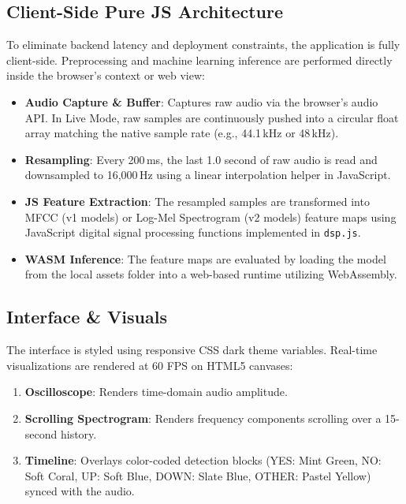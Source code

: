 \documentclass[11pt,a4paper]{article}
\begin{document}
\subsection{Client-Side Pure JS Architecture}
To eliminate backend latency and deployment constraints, the application is fully client-side. Preprocessing and machine learning inference are performed directly inside the browser's context or web view:
\begin{itemize}
    \item \textbf{Audio Capture \& Buffer}: Captures raw audio via the browser's audio API. In Live Mode, raw samples are continuously pushed into a circular float array matching the native sample rate (e.g., 44.1\,kHz or 48\,kHz).
    \item \textbf{Resampling}: Every 200\,ms, the last 1.0 second of raw audio is read and downsampled to 16,000\,Hz using a linear interpolation helper in JavaScript.
    \item \textbf{JS Feature Extraction}: The resampled samples are transformed into MFCC (v1 models) or Log-Mel Spectrogram (v2 models) feature maps using JavaScript digital signal processing functions implemented in \texttt{dsp.js}.
    \item \textbf{WASM Inference}: The feature maps are evaluated by loading the model from the local assets folder into a web-based runtime utilizing WebAssembly.
\end{itemize}

\subsection{Interface \& Visuals}
The interface is styled using responsive CSS dark theme variables. Real-time visualizations are rendered at 60 FPS on HTML5 canvases:
\begin{enumerate}
    \item \textbf{Oscilloscope}: Renders time-domain audio amplitude.
    \item \textbf{Scrolling Spectrogram}: Renders frequency components scrolling over a 15-second history.
    \item \textbf{Timeline}: Overlays color-coded detection blocks (YES: Mint Green, NO: Soft Coral, UP: Soft Blue, DOWN: Slate Blue, OTHER: Pastel Yellow) synced with the audio.
\end{enumerate}
\end{document}
